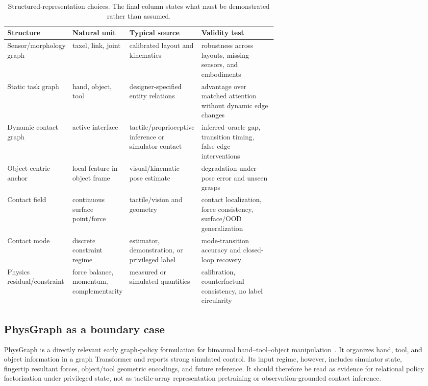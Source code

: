 \begin{table}[t]
\centering
\caption{Structured-representation choices. The final column states what must be
demonstrated rather than assumed.}
\label{tab:structured_models}
\begin{tabularx}{\linewidth}{P{0.18\linewidth} P{0.21\linewidth} P{0.25\linewidth} Y}
\toprule
\textbf{Structure} & \textbf{Natural unit} & \textbf{Typical source} & \textbf{Validity test} \\
\midrule
Sensor/morphology graph & taxel, link, joint & calibrated layout and kinematics & robustness across layouts, missing sensors, and embodiments \\
Static task graph & hand, object, tool & designer-specified entity relations & advantage over matched attention without dynamic edge changes \\
Dynamic contact graph & active interface & tactile/proprioceptive inference or simulator contact & inferred--oracle gap, transition timing, false-edge interventions \\
Object-centric anchor & local feature in object frame & visual/kinematic pose estimate & degradation under pose error and unseen grasps \\
Contact field & continuous surface point/force & tactile/vision and geometry & contact localization, force consistency, surface/OOD generalization \\
Contact mode & discrete constraint regime & estimator, demonstration, or privileged label & mode-transition accuracy and closed-loop recovery \\
Physics residual/constraint & force balance, momentum, complementarity & measured or simulated quantities & calibration, counterfactual consistency, no label circularity \\
\bottomrule
\end{tabularx}
\end{table}

\subsection{PhysGraph as a boundary case}

PhysGraph is a directly relevant early graph-policy formulation for bimanual
hand--tool--object manipulation~\cite{li2026physgraph}. It organizes hand, tool,
and object information in a graph Transformer and reports strong simulated
control. Its input regime, however, includes simulator state, fingertip resultant
forces, object/tool geometric encodings, and future reference. It should therefore
be read as evidence for relational policy factorization under privileged state,
not as tactile-array representation pretraining or observation-grounded contact
inference.


